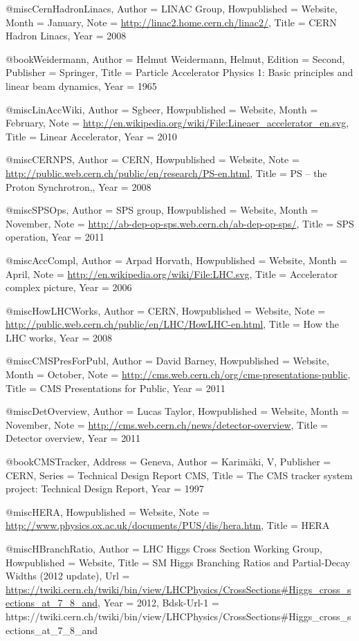 {{{{{{@misc{CernHadronLinacs,
	Author = {LINAC Group},
	Howpublished = {Website},
	Month = {January},
	Note = {\url{http://linac2.home.cern.ch/linac2/}},
	Title = {CERN Hadron Linacs},
	Year = {2008}}

@book{Weidermann,
	Author = {Helmut Weidermann, Helmut},
	Edition = {Second},
	Publisher = {Springer},
	Title = {Particle Accelerator Physics 1: Basic principles and linear beam dynamics},
	Year = {1965}}

@misc{LinAccWiki,
	Author = {Sgbeer},
	Howpublished = {Website},
	Month = {February},
	Note = {\url{http://en.wikipedia.org/wiki/File:Lineaer_accelerator_en.svg}},
	Title = {Linear Accelerator},
	Year = {2010}}

@misc{CERNPS,
	Author = {CERN},
	Howpublished = {Website},
	Note = {\url{http://public.web.cern.ch/public/en/research/PS-en.html}},
	Title = {PS -- the Proton Synchrotron,},
	Year = {2008}}

@misc{SPSOps,
	Author = {SPS group},
	Howpublished = {Website},
	Month = {November},
	Note = {\url{http://ab-dep-op-sps.web.cern.ch/ab-dep-op-sps/}},
	Title = {SPS operation},
	Year = {2011}}

@misc{AccCompl,
	Author = {Arpad Horvath},
	Howpublished = {Website},
	Month = {April},
	Note = {\url{http://en.wikipedia.org/wiki/File:LHC.svg}},
	Title = {Accelerator complex picture},
	Year = {2006}}

@misc{HowLHCWorks,
	Author = {CERN},
	Howpublished = {Website},
	Note = {\url{http://public.web.cern.ch/public/en/LHC/HowLHC-en.html}},
	Title = {How the LHC works},
	Year = {2008}}

@misc{CMSPresForPubl,
	Author = {David Barney},
	Howpublished = {Website},
	Month = {October},
	Note = {\url{http://cms.web.cern.ch/org/cms-presentations-public}},
	Title = {CMS Presentations for Public},
	Year = {2011}}

@misc{DetOverview,
	Author = {Lucas Taylor},
	Howpublished = {Website},
	Month = {November},
	Note = {\url{http://cms.web.cern.ch/news/detector-overview}},
	Title = {Detector overview},
	Year = {2011}}

@book{CMSTracker,
	Address = {Geneva},
	Author = {Karim{\"a}ki, V},
	Publisher = {CERN},
	Series = {Technical Design Report CMS},
	Title = {The CMS tracker system project: Technical Design Report},
	Year = {1997}}

@misc{HERA,
	Howpublished = {Website},
	Note = {\url{http://www.physics.ox.ac.uk/documents/PUS/dis/hera.htm}},
	Title = {HERA}}

@misc{HBranchRatio,
	Author = {LHC Higgs Cross Section Working Group},
	Howpublished = {Website},
	Title = {SM Higgs Branching Ratios and Partial-Decay Widths (2012 update)},
	Url = {\url{https://twiki.cern.ch/twiki/bin/view/LHCPhysics/CrossSections#Higgs_cross_sections_at_7_8_and}},
	Year = {2012},
	Bdsk-Url-1 = {https://twiki.cern.ch/twiki/bin/view/LHCPhysics/CrossSections#Higgs_cross_sections_at_7_8_and}}

}}}}}}
